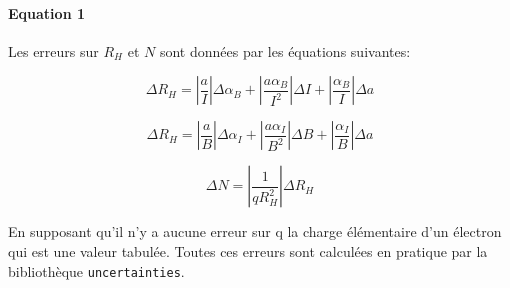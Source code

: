 \paragraph*{Equation 1}
Les erreurs sur $R_H$ et $N$ sont données par les équations suivantes:

\begin{equation}
    \label{eq:erreur:Rh_B}
    \Delta R_H = |\frac{a}{I}|\Delta \alpha_B + |\frac{a \alpha_B}{I^2}|\Delta I + |\frac{\alpha_B}{I}|\Delta a
\end{equation}

\begin{equation}
    \label{eq:erreur:Rh_I}
    \Delta R_H = |\frac{a}{B}|\Delta \alpha_I + |\frac{a \alpha_I}{B^2}|\Delta B + |\frac{\alpha_I}{B}|\Delta a
\end{equation}

\begin{equation}
    \label{eq:erreur:N}
    \Delta N = |\frac{1}{q R_H^2}|\Delta R_H
\end{equation}

En supposant qu'il n'y a aucune erreur sur q la charge élémentaire d'un électron qui est une valeur tabulée.
Toutes ces erreurs sont calculées en pratique par la bibliothèque \texttt{uncertainties}.
